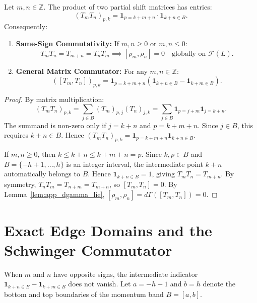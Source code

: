 \begin{theorem}
\label{thm:app_shift_composition}
Let $m, n \in \mathbb{Z}$. The product of two partial shift matrices has entries:
\begin{equation}
(T_m T_n)_{p, k} = \mathbf{1}_{p = k + m + n} \cdot \mathbf{1}_{k + n \in B}.
\end{equation}
Consequently:
\begin{enumerate}
    \item \textbf{Same-Sign Commutativity:} If $m, n \ge 0$ or $m, n \le 0$:
    \begin{equation}
    T_m T_n = T_{m+n} = T_n T_m \implies [\rho_m, \rho_n] = 0 \quad \text{globally on } \mathcal{F}(L).
    \end{equation}
    \item \textbf{General Matrix Commutator:} For any $m, n \in \mathbb{Z}$:
    \begin{equation}
    ([T_m, T_n])_{p, k} = \mathbf{1}_{p = k + m + n} \left( \mathbf{1}_{k + n \in B} - \mathbf{1}_{k + m \in B} \right).
    \end{equation}
\end{enumerate}
\end{theorem}

\begin{proof}
By matrix multiplication:
\[
(T_m T_n)_{p, k} = \sum_{j \in B} (T_m)_{p, j} (T_n)_{j, k} = \sum_{j \in B} \mathbf{1}_{p = j + m} \mathbf{1}_{j = k + n}.
\]
The summand is non-zero only if $j = k + n$ and $p = k + m + n$. Since $j \in B$, this requires $k + n \in B$.
Hence $(T_m T_n)_{p, k} = \mathbf{1}_{p = k + m + n} \mathbf{1}_{k + n \in B}$.

If $m, n \ge 0$, then $k \le k + n \le k + m + n = p$. Since $k, p \in B$ and $B = \{-h+1, \dots, h\}$ is an integer interval, the intermediate point $k + n$ automatically belongs to $B$. Hence $\mathbf{1}_{k + n \in B} = 1$, giving $T_m T_n = T_{m+n}$.
By symmetry, $T_n T_m = T_{n+m} = T_{m+n}$, so $[T_m, T_n] = 0$.
By Lemma~\ref{lem:app_dgamma_lie}, $[\rho_m, \rho_n] = d\Gamma([T_m, T_n]) = 0$.
\end{proof}

\section{Exact Edge Domains and the Schwinger Commutator}

When $m$ and $n$ have opposite signs, the intermediate indicator $\mathbf{1}_{k+n \in B} - \mathbf{1}_{k+m \in B}$ does not vanish.
Let $a = -h + 1$ and $b = h$ denote the bottom and top boundaries of the momentum band $B = [a, b]$.

